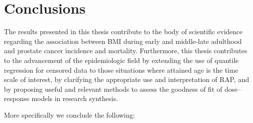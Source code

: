 %

\chapter{Conclusions}

The results presented in this thesis contribute to the body of scientific evidence regarding the association between BMI during early and middle-late adulthood and prostate cancer incidence and mortality. Furthermore, this thesis contributes to the advancement of the epidemiologic field by extending the use of quantile regression for censored data to those situations where attained age is the time scale of interest, by clarifying the appropriate use and interpretation of RAP, and by proposing useful and relevant methods to assess the goodness of fit of dose--response models in research synthesis.

More specifically we conclude the following:

